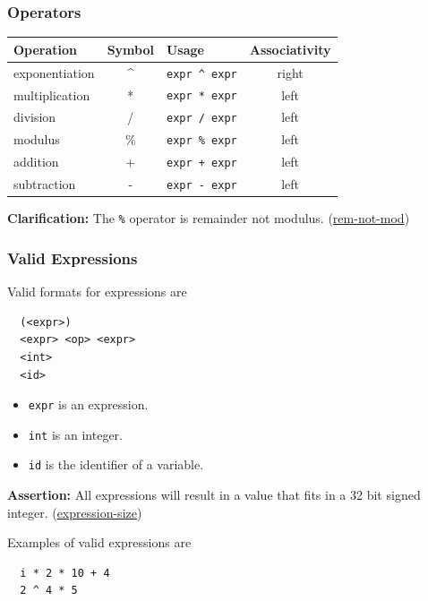 \documentclass{article}
\newcommand{\code}[1]{\texttt{\textmd{#1}}}
\newcommand{\assertion}[2]{\textbf{Assertion: }#1 (\hyperlink{#2}{#2})}
\newcommand{\clarification}[2]{\textbf{Clarification: }#1 (\hyperlink{#2}{#2})}
\begin{document}
\subsubsection{Operators}
\begin{center}
  \begin{tabular}{|l|c|l|c|}
    \hline
    \textbf{Operation} & \textbf{Symbol} & \textbf{Usage} &
    \textbf{Associativity} \\
    \hline
    exponentiation & \textasciicircum & \code{expr \textasciicircum\ expr} & right\\
    multiplication & *  & \code{expr * expr}  & left \\
    division       & /  & \code{expr / expr}  & left \\
    modulus        & \% & \code{expr \% expr}  & left \\
    addition       & +  & \code{expr + expr}  & left \\
    subtraction    & -  & \code{expr - expr}  & left \\
    \hline
  \end{tabular}
\end{center}

\clarification{The \code{\%} operator is remainder not modulus.}{rem-not-mod}

\subsubsection{Valid Expressions}
Valid formats for expressions are
\begin{lstlisting}
  (<expr>)
  <expr> <op> <expr>
  <int>
  <id>
\end{lstlisting}

\begin{itemize}
  \item \code{expr} is an expression.
  \item \code{int} is an integer.
  \item \code{id} is the identifier of a variable.
\end{itemize}

\assertion{All expressions will result in a value that fits in a 32 bit signed integer.}
{expression-size}

Examples of valid expressions are
\begin{lstlisting}
  i * 2 * 10 + 4
  2 ^ 4 * 5
\end{lstlisting}
\end{document}
